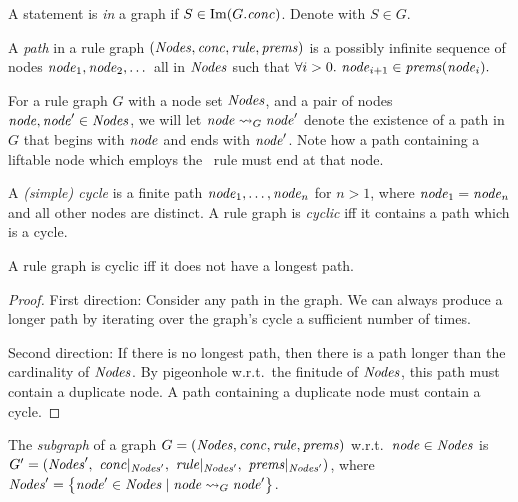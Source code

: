 A statement is \emph{in} a graph if $S \in \mathrm{Im}(G.\mathit{conc})$.
Denote with $S \in G$.

\begin{definition}
    A \emph{path} in a rule graph $(\mathit{Nodes},\mathit{conc},\mathit{rule},\mathit{prems})$
    is a possibly infinite sequence of nodes
    $\mathit{node}_1,\mathit{node}_2,\dots$
    all in $\mathit{Nodes}$
    such that
    $\forall i > 0.\
    \mathit{node}_{i+1} \in \mathit{prems}(\mathit{node}_i).
    $
\end{definition}

\newcommand*{\reaches}[3]{%
    \ensuremath{#1 \leadsto_{#3} #2}%
}
For a rule graph $G$ with a node set $\mathit{Nodes}$,
and a pair of nodes $\mathit{node}, \mathit{node}' \in \mathit{Nodes}$,
we will let \reaches{\node}{\node'}{G} denote
the existence of a path in $G$
that begins with $\mathit{node}$ and ends with $\mathit{node}'$.
Note how a path containing a liftable node 
which employs the \LIFT\ rule must end at that node.

\begin{definition}
    A \emph{(simple) cycle} is a finite path $\mathit{node}_1,\dots,\mathit{node}_n$
    for $n>1$,
    where $\mathit{node}_1 = \mathit{node}_n$ and all other nodes are distinct.
    A rule graph is \emph{cyclic}
    iff it contains a path which is a cycle.
\end{definition}


\begin{lemma}
    \label{lem:cyclic-iff-no-longest-path}
    A rule graph is cyclic iff
    it does not have a longest path.
\end{lemma}
\begin{proof}
First direction:
Consider any path in the graph.
We can always produce a longer path by iterating over the graph's cycle a sufficient number of times.

Second direction:
If there is no longest path, then there is a path longer than the cardinality of $\mathit{Nodes}$. By pigeonhole w.r.t.\ the finitude of $\mathit{Nodes}$,
this path must contain a duplicate node.
A path containing a duplicate node must contain a cycle.
\end{proof}

\newcommand{\restrict}[2]{%
    #1 {\mid_{#2}} %
}

\iffalse
\begin{definition}
    The \emph{subgraph} of a graph $G=(\mathit{Nodes},\mathit{conc},\mathit{rule},\mathit{prems})$ w.r.t.\ $\mathit{node} \in \mathit{Nodes}$
    is 
    \\
    $G'=(
        \DomNode',\
        \restrict\MapConc{\DomNode'},\
        \restrict\MapRule{\DomNode'},\
        \restrict\MapPrems{\DomNode'}
    )$,
    where $\DomNode' = 
        \SetBuild(\node' \in \DomNode | \reaches{\node}{\node'}{G})$.
\end{definition}

